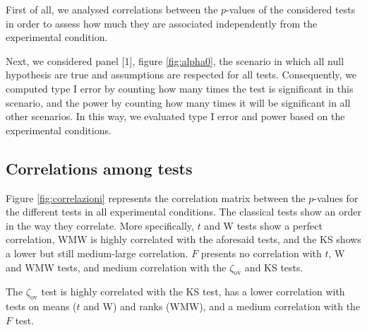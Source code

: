 \documentclass[twocolumn]{article}\usepackage[]{graphicx}\usepackage[]{xcolor}
\begin{document}
First of all, we analysed correlations between the $p$-values of the considered tests in order to assess how much they are associated independently from the experimental condition.

Next, we considered panel [1], figure \ref{fig:alpha0}, the scenario in which all null hypothesis are true and assumptions are respected for all tests. Consequently, we computed type I error by counting how many times the test is significant in this scenario, and the power by counting how many times it will be significant in all other scenarios. In this way, we evaluated type I error and power based on the experimental conditions.


\subsection{Correlations among tests}

Figure \ref{fig:correlazioni} represents the correlation matrix between the $p$-values for the different tests in all experimental conditions. The classical tests show an order in the way they correlate. More specifically, $t$ and W tests show a perfect correlation, WMW is highly correlated with the aforesaid tests, and the KS shows a lower but still medium-large correlation. $F$ presents no correlation with $t$, W and WMW tests, and medium correlation with the $\zeta_{\mbox{ov}}$ and KS tests. 

The $\zeta_{\mbox{ov}}$ test is highly correlated with the KS test, has a lower correlation with tests on means ($t$ and W) and ranks (WMW), and a medium correlation with the $F$ test.
\end{document}
